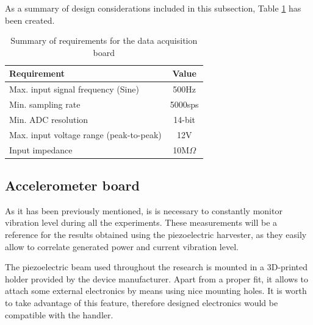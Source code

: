 \documentclass[12pt,a4paper]{article}
\begin{document}
As a summary of design considerations included in this subsection, Table \ref{tab:requirements} has been created.
\begin{table}[ht!]
\begin{tabular}{|l|c|}
\hline
\textbf{Requirement}              & \textbf{Value} \\ \hline
Max. input signal frequency (Sine) & 500Hz          \\ \hline
Min. sampling rate                 & 5000sps        \\ \hline
Min. ADC resolution                & 14-bit         \\ \hline
Max. input voltage range (peak-to-peak)     & 12V            \\ \hline
Input impedance                    & 10M$\Omega$            \\ \hline
\end{tabular}
\caption{Summary of requirements for the data acquisition board}
\label{tab:requirements}
\end{table}
\par

\subsection{Accelerometer board}
As it has been previously mentioned, is is necessary to constantly monitor vibration level during all the experiments. These measurements will be a reference for the results obtained using the piezoelectric harvester, as they easily allow to correlate generated power and current vibration level.
\par

The piezoelectric beam used throughout the research is mounted in a 3D-printed holder provided by the device manufacturer. Apart from a proper fit, it allows to attach some external electronics by means using nice mounting holes. It is worth to take advantage of this feature, therefore designed electronics would be compatible with the handler.
\par
\end{document}
